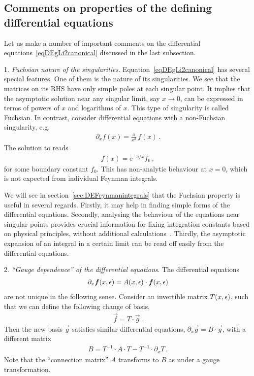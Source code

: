 \subsection{Comments on properties of the defining differential equations}
 \label{subsec:comments}

Let us make a number of important comments on the differential equations~\eqref{eqDEgLi2canonical} discussed in the last subsection.

\smallskip

1. {\it  Fuchsian nature of the singularities}. Equation~\eqref{eqDEgLi2canonical} has several special features. 
One of them is the nature of its singularities. We see that the matrices on its RHS have only simple poles at each singular point. 
It implies that the asymptotic solution near any singular limit, say $x\to 0$, can be expressed in terms of powers of $x$ and logarithms of $x$.
This type of singularity is called Fuchsian.
In contrast, consider differential equations with a non-Fuchsian singularity, e.g.
\begin{align} \label{eq:DEnonFuchsian}
\partial_x f(x) = \frac{a}{x^2} \, f(x) \,.
\end{align}
The solution to  reads 
\begin{align}
f(x) = \mathrm{e}^{-a/x} f_0\,,
\end{align} 
for some boundary constant $f_0$. This has non-analytic behaviour at $x=0$, which is not expected from individual Feynman integrals. 


We will see in section~\ref{sec:DEFeynmanintegrals} that the Fuchsian property is useful in several regards. Firstly, it may help in finding simple forms of the differential equations.
Secondly, analysing the behaviour of the equations near singular points provides crucial information for fixing integration constants based on physical principles, without additional calculations~\cite{ch4Henn:2020lye}.
Thirdly, the asymptotic expansion of an integral in a certain limit can be read off easily from the differential equations. 


\smallskip

2. {\it  ``Gauge dependence'' of the differential equations}. 
The differential equations 
\begin{align}\label{eq:generalDEincommentsection}
\partial_x \vec{f}(x,\eps) = A(x,\eps) \cdot \vec{f}(x,\eps)
\end{align}
 are not unique in the following sense. 
Consider an invertible matrix $T(x,\epsilon)$, such that we can define the following change of basis,
\begin{align} \label{eq:gaugetransformation}
\vec{f} = T \cdot \vec{g} \,.
\end{align}
Then the new basis $\vec{g}$ satisfies similar differential equations, $\partial_x \vec{g} = B \cdot \vec{g}$, with a different matrix
\begin{align}\label{eq:defB}
B = T^{-1} \cdot A \cdot T - T^{-1} \cdot \partial_x T \,.
\end{align}
Note that the ``connection matrix'' $A$ transforms to $B$ as under a gauge transformation.




